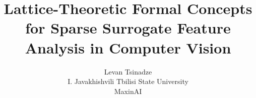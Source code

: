 \title{Lattice-Theoretic Formal Concepts for Sparse Surrogate
  Feature Analysis in Computer Vision}
\author{Levan Tsinadze\\
  \small I. Javakhishvili Tbilisi State University\\
  \small MaxinAI}
\date{}
